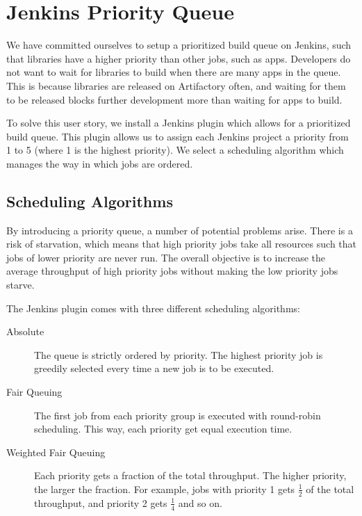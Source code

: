 \chapter{Jenkins Priority Queue}
We have committed ourselves to setup a prioritized build queue on Jenkins, such that libraries have a higher priority than other jobs, such as apps. Developers do not want to wait for libraries to build when there are many apps in the queue. This is because libraries are released on Artifactory often, and waiting for them to be released blocks further development more than waiting for apps to build.

To solve this user story, we install a Jenkins plugin \parencite{jenkins-priority-plugin} which allows for a prioritized build queue. This plugin allows us to assign each Jenkins project a priority from 1 to 5 (where 1 is the highest priority). We select a scheduling algorithm which manages the way in which jobs are ordered.

\section{Scheduling Algorithms}
By introducing a priority queue, a number of potential problems arise. There is a risk of starvation, which means that high priority jobs take all resources such that jobs of lower priority are never run. The overall objective is to increase the average throughput of high priority jobs without making the low priority jobs starve.

The Jenkins plugin comes with three different scheduling algorithms:

\begin{description}
  \item[Absolute] The queue is strictly ordered by priority. The highest priority job is greedily selected every time a new job is to be executed.
  \item[Fair Queuing] The first job from each priority group is executed with round-robin scheduling. This way, each priority get equal execution time.
  \item[Weighted Fair Queuing] Each priority gets a fraction of the total throughput. The higher priority, the larger the fraction. For example, jobs with priority 1 gets $\frac{1}{2}$ of the total throughput, and priority 2 gets $\frac{1}{4}$ and so on.
\end{description}

